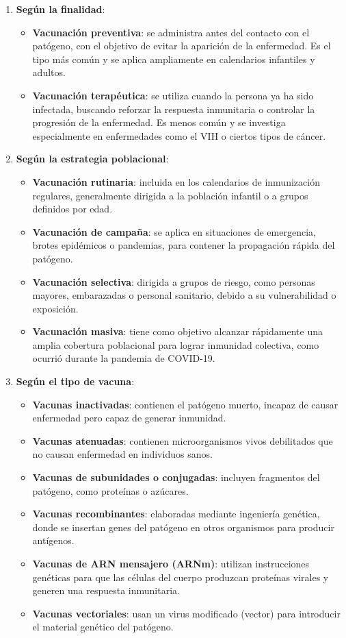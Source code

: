 \begin{enumerate}
    \item \textbf{Según la finalidad}:
    \begin{itemize}
        \item \textbf{Vacunación preventiva}: se administra antes del contacto con el patógeno, con el objetivo de evitar la aparición de la enfermedad. Es el tipo más común y se aplica ampliamente en calendarios infantiles y adultos.
        \item \textbf{Vacunación terapéutica}: se utiliza cuando la persona ya ha sido infectada, buscando reforzar la respuesta inmunitaria o controlar la progresión de la enfermedad. Es menos común y se investiga especialmente en enfermedades como el VIH o ciertos tipos de cáncer.
    \end{itemize}
    \item \textbf{Según la estrategia poblacional}:
    \begin{itemize}
        \item \textbf{Vacunación rutinaria}: incluida en los calendarios de inmunización regulares, generalmente dirigida a la población infantil o a grupos definidos por edad.
        \item \textbf{Vacunación de campaña}: se aplica en situaciones de emergencia, brotes epidémicos o pandemias, para contener la propagación rápida del patógeno.
        \item \textbf{Vacunación selectiva}: dirigida a grupos de riesgo, como personas mayores, embarazadas o personal sanitario, debido a su vulnerabilidad o exposición.
        \item \textbf{Vacunación masiva}: tiene como objetivo alcanzar rápidamente una amplia cobertura poblacional para lograr inmunidad colectiva, como ocurrió durante la pandemia de COVID-19.
    \end{itemize}
    
    \item \textbf{Según el tipo de vacuna}:
    \begin{itemize}
        \item \textbf{Vacunas inactivadas}: contienen el patógeno muerto, incapaz de causar enfermedad pero capaz de generar inmunidad. 
        \item \textbf{Vacunas atenuadas}: contienen microorganismos vivos debilitados que no causan enfermedad en individuos sanos.
        \item \textbf{Vacunas de subunidades o conjugadas}: incluyen fragmentos del patógeno, como proteínas o azúcares.
        \item \textbf{Vacunas recombinantes}: elaboradas mediante ingeniería genética, donde se insertan genes del patógeno en otros organismos para producir antígenos. 
        \item \textbf{Vacunas de ARN mensajero (ARNm)}: utilizan instrucciones genéticas para que las células del cuerpo produzcan proteínas virales y generen una respuesta inmunitaria.
        \item \textbf{Vacunas vectoriales}: usan un virus modificado (vector) para introducir el material genético del patógeno. 
    \end{itemize}


\end{enumerate}
